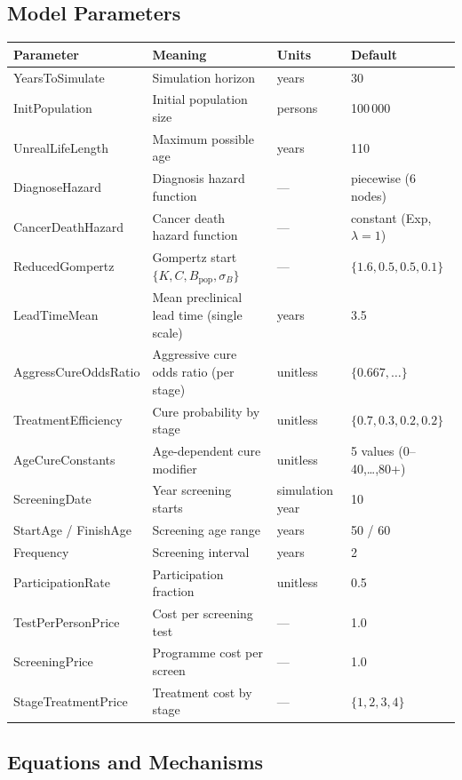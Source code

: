 \documentclass[12pt,a4paper]{article}
\begin{document}
\subsection{Model Parameters}

\begin{center}
\footnotesize
\begin{tabular}{@{}llll@{}}
\toprule
\textbf{Parameter} & \textbf{Meaning} & \textbf{Units} & \textbf{Default} \\
\midrule
YearsToSimulate & Simulation horizon & years & 30 \\
InitPopulation & Initial population size & persons & 100\,000 \\
UnrealLifeLength & Maximum possible age & years & 110 \\
DiagnoseHazard & Diagnosis hazard function & --- & piecewise (6 nodes) \\
CancerDeathHazard & Cancer death hazard function & --- & constant (Exp, $\lambda=1$) \\
ReducedGompertz & Gompertz start $\{K,C,B_{\text{pop}},\sigma_B\}$ & --- & $\{1.6,0.5,0.5,0.1\}$ \\
LeadTimeMean & Mean preclinical lead time (single scale) & years & 3.5 \\
AggressCureOddsRatio & Aggressive cure odds ratio (per stage) & unitless & $\{0.667,\dots\}$ \\
TreatmentEfficiency & Cure probability by stage & unitless & $\{0.7,0.3,0.2,0.2\}$ \\
AgeCureConstants & Age-dependent cure modifier & unitless & 5 values (0--40,\dots,80+) \\
ScreeningDate & Year screening starts & simulation year & 10 \\
StartAge / FinishAge & Screening age range & years & 50 / 60 \\
Frequency & Screening interval & years & 2 \\
ParticipationRate & Participation fraction & unitless & 0.5 \\
TestPerPersonPrice & Cost per screening test & --- & 1.0 \\
ScreeningPrice & Programme cost per screen & --- & 1.0 \\
StageTreatmentPrice & Treatment cost by stage & --- & $\{1,2,3,4\}$ \\
\bottomrule
\end{tabular}
\end{center}

\subsection{Equations and Mechanisms}
\end{document}
